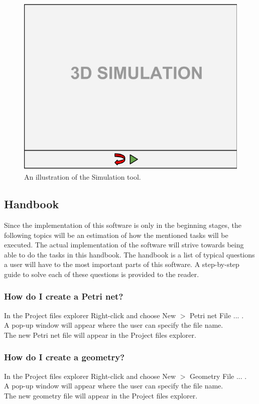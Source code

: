 \begin{figure}[ht]
\begin{center}
\includegraphics[scale=0.5]{image/simulation_tool.png}
\caption{An illustration of the Simulation tool.}
\label{fig:simulation_tool.}
\end{center}
\end{figure}

\subsection{Handbook}
Since the implementation of this software is only in the beginning stages, the following topics will be an estimation of how the mentioned tasks will be executed. The actual implementation of the software will strive towards being able to do the tasks in this handbook. 
The handbook is a list of typical questions a user will have to the most important parts of this software. A step-by-step guide to solve each of these questions is provided to the reader.

\subsubsection{How do I create a Petri net?}
In the Project files explorer Right-click and choose New $>$ Petri net File ... . \\
A pop-up window will appear where the user can specify the file name. \\
The new Petri net file will appear in the Project files explorer.   

\subsubsection{How do I create a geometry?}
In the Project files explorer Right-click and choose New $>$ Geometry File ... .  \\
A pop-up window will appear where the user can specify the file name. \\
The new geometry file will appear in the Project files explorer.   

